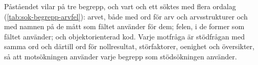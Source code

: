 Påståendet vilar på tre begrepp, och vart och ett söktes med flera
ordalag (\cref{tab:sok-begrepp-arvfel}): arvet, både med ord för arv och
arvsstrukturer och med namnen på de mått som fältet använder för dem;
felen, i de former som fältet använder; och objektorienterad kod.  Varje
motfråga är stödfrågan med samma ord och därtill ord för nollresultat,
störfaktorer, oenighet och översikter, så att motsökningen använder
varje begrepp som stödsökningen använder.

